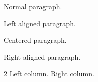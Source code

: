 \documentclass[12pt,a4paper]{article}
\begin{document}
Normal paragraph.
\begin{flushleft}
Left aligned paragraph.
\end{flushleft}
\begin{center}
Centered paragraph.
\end{center}
\begin{flushright}
Right aligned paragraph.
\end{flushright}
\begin{multicols}{2}
Left column.
\columnbreak
Right column.
\end{multicols}
\end{document}
